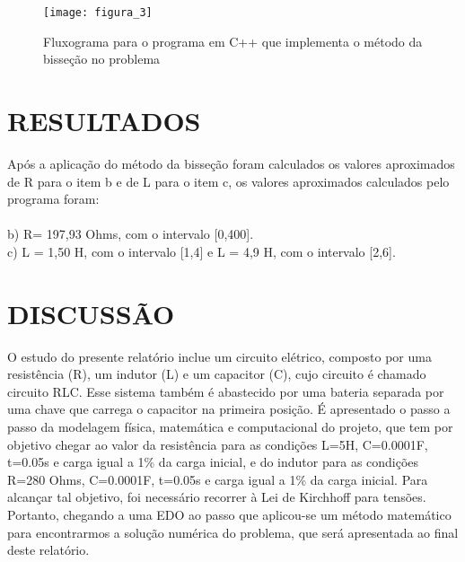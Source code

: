\documentclass[12pt,fleqn]{article}
\begin{document}
\begin{figure}[H] %
\vspace{-2pt}
\begin{center}
\texttt{[image: figura\_3]}%
\caption{Fluxograma para o programa em C++ que implementa o método da bisseção no problema}
\label{fig3}%
\end{center}
\end{figure}

\section{RESULTADOS}
Após a aplicação do método da bisseção foram calculados os valores aproximados de R para o item b e de L para o item c, os valores aproximados calculados pelo programa foram:\\ \\
b) R= 197,93 Ohms, com o intervalo [0,400].\\
c) L = 1,50 H, com o intervalo [1,4] e L = 4,9 H, com o intervalo [2,6].

\section{DISCUSSÃO}
O estudo do presente relatório inclue um circuito elétrico, composto por uma resistência (R), um indutor (L) e um capacitor (C), cujo circuito é chamado circuito RLC. Esse sistema também é abastecido por uma bateria separada por uma chave que carrega o capacitor na primeira posição. É apresentado o passo a passo da modelagem física, matemática e computacional do projeto, que tem por objetivo chegar ao valor da resistência para as condições L=5H, C=0.0001F, t=0.05s e carga igual a 1\% da carga inicial, e do indutor para as condições R=280 Ohms, C=0.0001F, t=0.05s e carga igual a 1\% da carga inicial. Para alcançar tal objetivo, foi necessário recorrer à Lei de Kirchhoff para tensões. Portanto, chegando a uma EDO ao passo que aplicou-se um método matemático para encontrarmos a solução numérica do problema, que será apresentada ao ﬁnal deste relatório.



\vspace*{-0.1cm}
\end{document}
